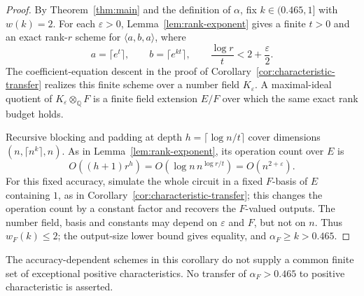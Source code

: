 \begin{proof}
By Theorem~\ref{thm:main} and the definition of \(\alpha\), fix
\(k\in(0.465,1]\) with \(w(k)=2\).  For each \(\varepsilon>0\),
Lemma~\ref{lem:rank-exponent} gives a finite \(t>0\) and an exact
rank-\(r\) scheme for \(\langle a,b,a\rangle\), where
\[
 a=\lceil e^t\rceil,\qquad b=\lceil e^{kt}\rceil,\qquad
 \frac{\log r}{t}<2+\frac{\varepsilon}{2}.
\]
The coefficient-equation descent in the proof of
Corollary~\ref{cor:characteristic-transfer} realizes this finite scheme
over a number field \(K_{\varepsilon}\).  A maximal-ideal quotient of
\(K_{\varepsilon}\otimes_{\mathbb Q}F\) is a finite field extension
\(E/F\) over which the same exact rank budget holds.

Recursive blocking and padding at depth \(h=\lceil\log n/t\rceil\)
cover dimensions \((n,\lceil n^k\rceil,n)\).  As in
Lemma~\ref{lem:rank-exponent}, its operation count over \(E\) is
\[
 O((h+1)r^h)=O\!\left(\log n\,n^{\log r/t}\right)
             =O(n^{2+\varepsilon}).
\]
For this fixed accuracy, simulate the whole circuit in a fixed
\(F\)-basis of \(E\) containing \(1\), as in
Corollary~\ref{cor:characteristic-transfer}; this changes the operation
count by a constant factor and recovers the \(F\)-valued outputs.
The number field, basis and constants may depend on \(\varepsilon\)
and \(F\), but not on \(n\).  Thus \(w_F(k)\le2\); the output-size
lower bound gives equality, and \(\alpha_F\ge k>0.465\).
\end{proof}

The accuracy-dependent schemes in this corollary do not supply a common
finite set of exceptional positive characteristics.  No transfer of
\(\alpha_F>0.465\) to positive characteristic is asserted.
